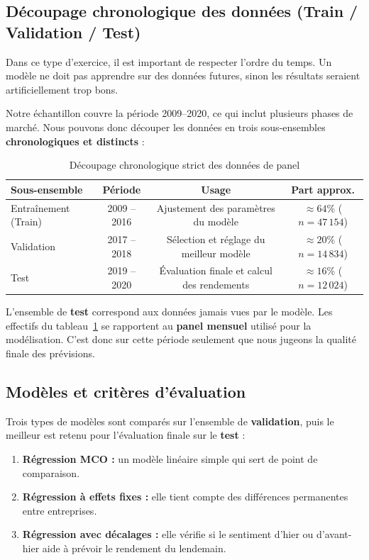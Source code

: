\documentclass[11pt,a4paper]{article}
\begin{document}
\subsection{Découpage chronologique des données (Train / Validation / Test)}

Dans ce type d'exercice, il est important de respecter l'ordre du temps. Un modèle ne doit pas apprendre sur des données futures, sinon les résultats seraient artificiellement trop bons.

Notre échantillon couvre la période 2009--2020, ce qui inclut plusieurs phases de marché. Nous pouvons donc découper les données en trois sous-ensembles \textbf{chronologiques et distincts} :

\begin{table}[H]
\centering
\begin{tabular}{lccc}
\toprule
\textbf{Sous-ensemble} & \textbf{Période} & \textbf{Usage} & \textbf{Part approx.}\\
\midrule
Entraînement (Train) & 2009 -- 2016 & Ajustement des paramètres du modèle & $\approx 64\%$ ($n=47\,154$) \\
Validation           & 2017 -- 2018 & Sélection et réglage du meilleur modèle & $\approx 20\%$ ($n=14\,834$) \\
Test                 & 2019 -- 2020 & Évaluation finale et calcul des rendements & $\approx 16\%$ ($n=12\,024$) \\
\bottomrule
\end{tabular}
\caption{Découpage chronologique strict des données de panel}
\label{tab:split}
\end{table}

L'ensemble de \textbf{test} correspond aux données jamais vues par le modèle. Les effectifs du tableau~\ref{tab:split} se rapportent au \textbf{panel mensuel} utilisé pour la modélisation. C'est donc sur cette période seulement que nous jugeons la qualité finale des prévisions.

\subsection{Modèles et critères d'évaluation}

Trois types de modèles sont comparés sur l'ensemble de \textbf{validation}, puis le meilleur est retenu pour l'évaluation finale sur le \textbf{test} :

\begin{enumerate}
    \item \textbf{Régression MCO :} un modèle linéaire simple qui sert de point de comparaison.

    \item \textbf{Régression à effets fixes :} elle tient compte des différences permanentes entre entreprises.

    \item \textbf{Régression avec décalages :} elle vérifie si le sentiment d'hier ou d'avant-hier aide à prévoir le rendement du lendemain.
\end{enumerate}
\end{document}
